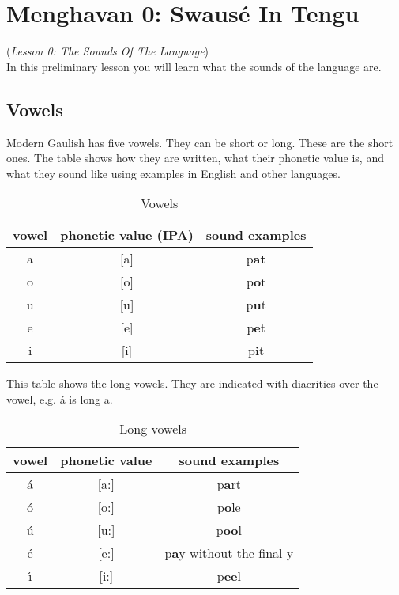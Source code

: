 \section{Menghavan 0: Swaus\'{e} In Tengu}
(\textit{Lesson 0: The Sounds Of The Language})\\

\noindent In this preliminary lesson you will learn what the sounds of the language are.

\subsection{Vowels}
\noindent Modern Gaulish has five vowels. They can be short or long. These are the short ones. The table shows how they are written, what their phonetic value is, and what they sound like using examples in English and other languages.

\begin{table}[H]
\begin{center}
\begin{tabu}{|c|c|c|}
  \toprule
  vowel & phonetic value (IPA) & sound examples\\
  \toprule
  a & [a] & p\textbf{at}\\
  o & [o] & p\textbf{o}t\\
  u & [u] & p\textbf{u}t\\
  e & [e] & p\textbf{e}t\\
  i & [i] & p\textbf{i}t\\
  \bottomrule
\end{tabu}
\end{center}
\caption{Vowels}
\label{phonology_vowels}
\end{table}

\noindent This table shows the long vowels. They are indicated with diacritics over the vowel, e.g. \'{a} is long a.

\begin{table}[H]
\begin{center}
\begin{tabu}{|c|c|c|}
  \toprule
  vowel & phonetic value & sound examples\\
  \toprule
  \'{a} & [a:] & p\textbf{a}rt\\
  \'{o} & [o:] & p\textbf{o}le\\
  \'{u} & [u:] & p\textbf{oo}l\\
  \'{e} & [e:] & p\textbf{a}y without the final y\\
  \'{\i} & [i:] & p\textbf{ee}l\\
  \bottomrule
\end{tabu}
\end{center}
\caption{Long vowels}
\label{phonology_long_vowels}
\end{table}


